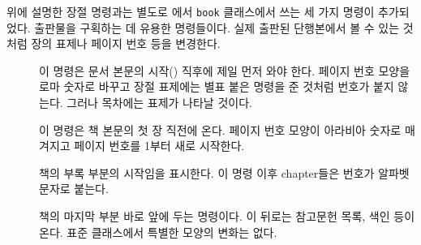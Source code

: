 위에 설명한 장절 명령과는 별도로 \LaTeXe 에서 \verb|book| 클래스에서 쓰는 세 가지 명령이 추가되었다.
출판물을 구획하는 데 유용한 명령들이다. 실제 출판된 단행본에서 볼 수 있는 것처럼 장의 표제나 페이지 번호 등을 변경한다.
\begin{description}
  \item[] 이 명령은 문서 본문의 시작(\verb||) 직후에 제일 먼저 와야 한다. 페이지 번호 모양을 로마 숫자로 바꾸고 장절 표제에는 별표 붙은 명령을 준 것처럼 번호가 붙지 않는다. 그러나 목차에는 표제가 나타날 것이다.
  \item[] 이 명령은 책 본문의 첫 장 직전에 온다. 페이지 번호 모양이 아라비아 숫자로 매겨지고 페이지 번호를 1부터 새로 시작한다.
  \item[] 책의 부록 부분의 시작임을 표시한다. 이 명령 이후 chapter들은 번호가 알파벳 문자로 붙는다.
  \item[] 책의 마지막 부분 바로 앞에 두는 명령이다. 이 뒤로는 참고문헌 목록, 색인 등이 온다. 표준 클래스에서 특별한 모양의 변화는 없다.
\end{description} 


